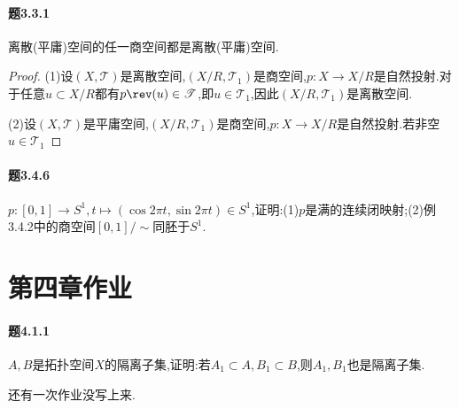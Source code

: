 \documentclass{article}
\begin{document}
\paragraph{题3.3.1}离散(平庸)空间的任一商空间都是离散(平庸)空间.
\begin{proof}
    (1)设$(X,\mathscr{T})$是离散空间,$(X/R,\mathscr{T}_1)$是商空间,$p:X\to X/R$是自然投射.对于任意$u\subset X/R$都有$p\rev(u)\in \mathscr{T}$,即$u\in \mathscr{T}_1$,因此$(X/R,\mathscr{T}_1)$是离散空间.

    (2)设$(X,\mathscr{T})$是平庸空间,$(X/R,\mathscr{T}_1)$是商空间,$p:X\to X/R$是自然投射.若非空$u\in \mathscr{T}_1$
\end{proof}

\paragraph{题3.4.6}$p:[0,1]\to S^1, t\mapsto (\cos 2\pi t,\sin 2\pi t)\in S^1$,证明:(1)$p$是满的连续闭映射;(2)例3.4.2中的商空间$[0,1]/\sim$同胚于$S^1$.

\section{第四章作业}

\paragraph{题4.1.1}$A,B$是拓扑空间$X$的隔离子集,证明:若$A_1\subset A,B_1\subset B$,则$A_1,B_1$也是隔离子集.

还有一次作业没写上来.
\end{document}
